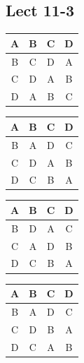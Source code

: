 \documentclass[11pt,letterpaper]{article}
\begin{document}
\subsection*{Lect 11-3}
\noindent \begin{tabular}{|cccc|}
\hline
A&B&C&D\\
\hline
B&C&D&A \\
\hline
C&D&A&B\\
\hline
D&A&B&C\\
\hline
\end{tabular}
\quad
\begin{tabular}{|cccc|}
\hline
A&B&C&D\\
\hline
B&A&D&C \\
\hline
C&D&A&B\\
\hline
D&C&B&A\\
\hline
\end{tabular}
\quad
\begin{tabular}{|cccc|}
\hline
A&B&C&D\\
\hline
B&D&A&C \\
\hline
C&A&D&B\\
\hline
D&C&B&A\\
\hline
\end{tabular}
\quad
\begin{tabular}{|cccc|}
\hline
A&B&C&D\\
\hline
B&A&D&C \\
\hline
C&D&B&A\\
\hline
D&C&A&B\\
\hline
\end{tabular}
\end{document}
